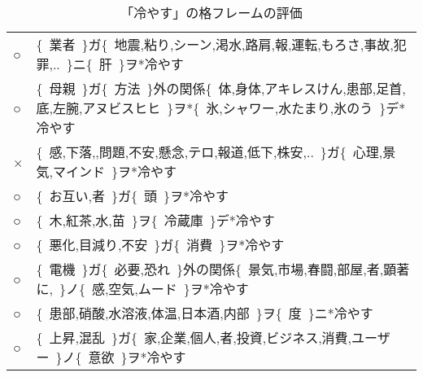 \documentclass[fleqn]{nlp}
\newcommand{\sm}[1]{}
\begin{document}
\begin{table} \small
 \caption{「冷やす」の格フレームの評価}
 \label{Evaluation::CF-Hiyasu}
 \begin{tabular}{lp{13cm}} \hline
 ○ & \{~業者~\}ガ\hspace{0.8em}\{~地震,粘り,シーン,渇水,路肩,報,運転,もろさ,事故,犯罪,..~\}ニ\hspace{0.8em}\{~肝~\}ヲ*\hspace{0.8em}冷やす \\
 ○ & \{~母親~\}ガ\hspace{0.8em}\{~方法~\}外の関係\hspace{0.8em}\{~体,身体,アキレスけん,患部,足首,底,左腕,アヌビスヒヒ~\}ヲ*\hspace{0.8em}\{~氷,シャワー,水たまり,氷のう~\}デ*\hspace{0.8em}冷やす \\
 × & \{~感,下落,\sm{補文},問題,不安,懸念,テロ,報道,低下,株安,..~\}ガ\hspace{0.8em}\{~心理,景気,マインド~\}ヲ*\hspace{0.8em}冷やす \\
 ○ & \{~お互い,者~\}ガ\hspace{0.8em}\{~頭~\}ヲ*\hspace{0.8em}冷やす \\
 ○ & \{~木,紅茶,水,苗~\}ヲ\hspace{0.8em}\{~冷蔵庫~\}デ*\hspace{0.8em}冷やす \\
 ○ & \{~悪化,目減り,不安~\}ガ\hspace{0.8em}\{~消費~\}ヲ*\hspace{0.8em}冷やす \\
 ○ & \{~電機~\}ガ\hspace{0.8em}\{~必要,恐れ~\}外の関係\hspace{0.8em}\{~景気,市場,春闘,部屋,者,顕著に,\sm{時間}~\}ノ\hspace{0.8em}\{~感,空気,ムード~\}ヲ*\hspace{0.8em}冷やす \\
 ○ & \{~患部,硝酸,水溶液,体温,日本酒,内部~\}ヲ\hspace{0.8em}\{~\sm{数量}度~\}ニ*\hspace{0.8em}冷やす \\
 ○ & \{~上昇,混乱~\}ガ\hspace{0.7em}\{~家,企業,個人,者,投資,ビジネス,消費,ユーザー~\}ノ\hspace{0.7em}\{~意欲~\}ヲ*\hspace{0.7em}冷やす \\

\end{tabular}
\end{table}
\end{document}
